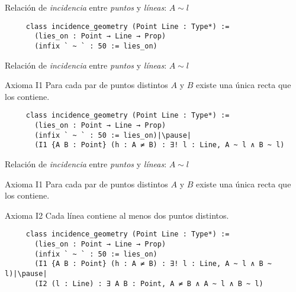 \begin{frame}[fragile]
	Relación de \textit{incidencia} entre \textit{puntos} y \textit{líneas}: $A\sim l$

	\pause\vspace{108.5px}

	\begin{lstlisting}
     class incidence_geometry (Point Line : Type*) :=
       (lies_on : Point → Line → Prop)
       (infix ` ~ ` : 50 := lies_on)
    \end{lstlisting}
\end{frame}


\begin{frame}[fragile]
	Relación de \textit{incidencia} entre \textit{puntos} y \textit{líneas}: $A\sim l$
	\begin{block}{Axioma I1}
		Para cada par de puntos distintos $A$ y $B$ existe una única recta que los
		contiene.
	\end{block}

	\vspace{72px}

	\begin{lstlisting}
     class incidence_geometry (Point Line : Type*) :=
       (lies_on : Point → Line → Prop)
       (infix ` ~ ` : 50 := lies_on)|\pause|
       (I1 {A B : Point} (h : A ≠ B) : ∃! l : Line, A ~ l ∧ B ~ l)
    \end{lstlisting}
\end{frame}

\begin{frame}[fragile]
	Relación de \textit{incidencia} entre \textit{puntos} y \textit{líneas}: $A\sim l$
	\begin{block}{Axioma I1}
		Para cada par de puntos distintos $A$ y $B$ existe una única recta que los
		contiene.
	\end{block}

	\begin{block}{Axioma I2}
		Cada línea contiene al menos dos puntos distintos.
	\end{block}

	\vspace{36.5px}

	\begin{lstlisting}
     class incidence_geometry (Point Line : Type*) :=
       (lies_on : Point → Line → Prop)
       (infix ` ~ ` : 50 := lies_on)
       (I1 {A B : Point} (h : A ≠ B) : ∃! l : Line, A ~ l ∧ B ~ l)|\pause|
       (I2 (l : Line) : ∃ A B : Point, A ≠ B ∧ A ~ l ∧ B ~ l)
    \end{lstlisting}
\end{frame}

